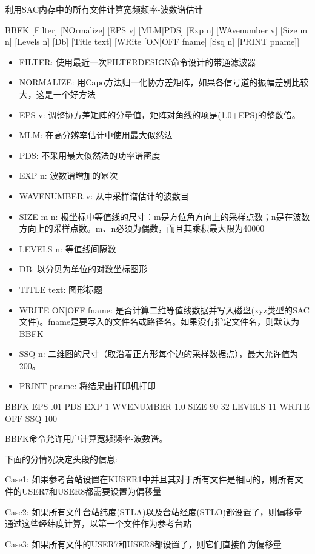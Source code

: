 \label{cmd:bbfk}

利用SAC内存中的所有文件计算宽频频率-波数谱估计

 BBFK [Filter] [NOrmalize] [EPS v] [MLM|PDS] [Exp n] [WAvenumber v] [Size m n] [Levels n] [Db] [Title text] [WRite [ON|OFF fname] [Ssq n] [PRINT pname]]

\begin{itemize}
\item FILTER: 使用最近一次FILTERDESIGN命令设计的带通滤波器
\item NORMALIZE: 用Capo方法归一化协方差矩阵，如果各信号道的振幅差别比较大，这是一个好方法
\item EPS v: 调整协方差矩阵的分量值，矩阵对角线的项是(1.0+EPS)的整数倍。
\item MLM: 在高分辨率估计中使用最大似然法
\item PDS: 不采用最大似然法的功率谱密度
\item EXP n: 波数谱增加的幂次
\item WAVENUMBER v: 从中采样谱估计的波数目
\item SIZE m n: 极坐标中等值线的尺寸：m是方位角方向上的采样点数；n是在波数方向上的采样点数。m、n必须为偶数，而且其乘积最大限为40000 
\item LEVELS n: 等值线间隔数
\item DB: 以分贝为单位的对数坐标图形
\item TITLE text: 图形标题
\item WRITE ON|OFF fname: 是否计算二维等值线数据并写入磁盘(xyz类型的SAC文件)。fname是要写入的文件名或路径名。如果没有指定文件名，则默认为BBFK
\item SSQ n: 二维图的尺寸（取沿着正方形每个边的采样数据点），最大允许值为200。
\item PRINT pname: 将结果由打印机打印
\end{itemize}

BBFK EPS .01 PDS EXP 1 WVENUMBER 1.0 SIZE 90 32 LEVELS 11 WRITE OFF SSQ 100

BBFK命令允许用户计算宽频频率-波数谱。

下面的分情况决定头段的信息:

Case1: 如果参考台站设置在KUSER1中并且其对于所有文件是相同的，则所有文件的USER7和USER8都需要设置为偏移量

Case2: 如果所有文件台站纬度(STLA)以及台站经度(STLO)都设置了，则偏移量通过这些经纬度计算，以第一个文件作为参考台站

Case3: 如果所有文件的USER7和USER8都设置了，则它们直接作为偏移量


